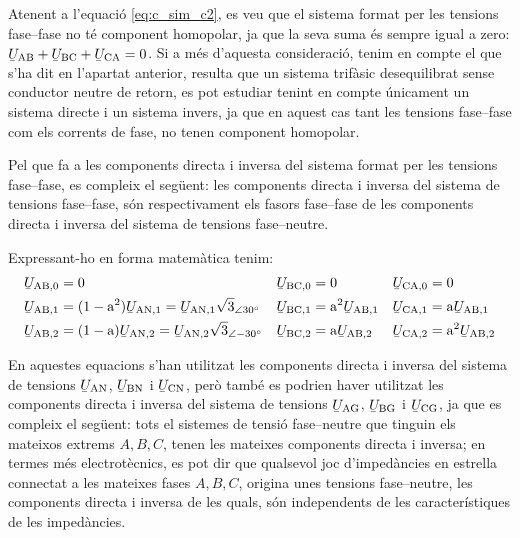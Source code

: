 Atenent a l'equació \eqref{eq:c_sim_c2}, es veu que el sistema
format per les tensions fase--fase no té component homopolar, ja que
la seva suma  és sempre igual a zero: $\cmplx{U}\ped{AB} +
\cmplx{U}\ped{BC} + \cmplx{U}\ped{CA} = 0$. Si a més
d'aquesta consideració, tenim en compte el que s'ha dit en l'apartat
anterior, resulta que un sistema trifàsic desequilibrat sense conductor
neutre de retorn, es pot estudiar tenint en compte únicament un sistema directe
i un sistema invers, ja que en aquest cas tant les tensions fase--fase com els
corrents de fase, no tenen component homopolar.

Pel que fa a les components directa i inversa del sistema format per
les tensions fase--fase, es compleix el següent: les components
directa i inversa del sistema de tensions fase--fase, són
respectivament els fasors fase--fase de les components directa i
inversa del sistema de tensions fase--neutre.

Expressant-ho en forma matemàtica tenim:
\begin{subequations}
\begin{align}
   \cmplx{U}\ped{AB,0} &= 0 &
   \cmplx{U}\ped{BC,0} &= 0 &
   \cmplx{U}\ped{CA,0} &= 0 \\
   \cmplx{U}\ped{AB,1} &= (1-\au^2) \cmplx{U}\ped{AN,1} =
   \cmplx{U}\ped{AN,1} \sqrt{3}_{\angle\ang{30}} &
   \cmplx{U}\ped{BC,1} &= \au^2 \cmplx{U}\ped{AB,1} &
   \cmplx{U}\ped{CA,1} &= \au \cmplx{U}\ped{AB,1} \label{eq:c_sim_a3} \\
   \cmplx{U}\ped{AB,2} &= (1-\au) \cmplx{U}\ped{AN,2}  =
   \cmplx{U}\ped{AN,2} \sqrt{3}_{\angle\ang{-30}}&
   \cmplx{U}\ped{BC,2} &= \au \cmplx{U}\ped{AB,2} &
   \cmplx{U}\ped{CA,2} &= \au^2 \cmplx{U}\ped{AB,2} \label{eq:c_sim_b3}
\end{align}
\end{subequations}

En aquestes equacions s'han utilitzat les components directa i
inversa del sistema de tensions
$\cmplx{U}\ped{AN}$, $\cmplx{U}\ped{BN}$ i $\cmplx{U}\ped{CN}$,
però també es podrien haver utilitzat les components directa i
inversa del sistema de tensions
$\cmplx{U}\ped{AG}$, $\cmplx{U}\ped{BG}$ i $\cmplx{U}\ped{CG}$,
ja que es compleix el següent: tots el sistemes de tensió
fase--neutre que tinguin els mateixos extrems $A, B,
C$, tenen les mateixes components directa i inversa; en termes
més electrotècnics, es pot dir que qualsevol joc d'impedàncies en
estrella connectat a les mateixes fases $A, B, C$,
origina unes tensions fase--neutre, les components directa i inversa
de les quals, són independents de les característiques de les
impedàncies.

